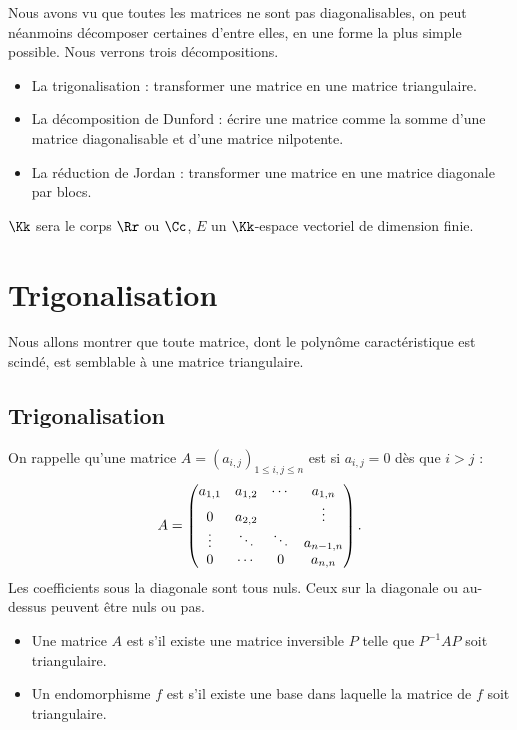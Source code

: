 \documentclass[12pt, class=report,crop=false]{standalone}
\begin{document}


Nous avons vu que toutes les matrices ne sont pas diagonalisables, 
on peut néanmoins décomposer certaines d'entre elles, en une forme la plus simple possible.
Nous verrons trois décompositions. 
\begin{itemize}
  \item La trigonalisation : transformer une matrice en une matrice triangulaire.
  \item La décomposition de Dunford : écrire une matrice comme la somme d'une matrice diagonalisable et d'une matrice nilpotente.
  \item La réduction de Jordan : transformer une matrice en une matrice diagonale par blocs.
\end{itemize}

$\Kk$ sera le corps $\Rr$ ou $\Cc$, $E$ un $\Kk$-espace vectoriel de dimension finie.


\section{Trigonalisation}

Nous allons montrer que toute matrice, dont le polynôme caractéristique est scindé, est semblable à une matrice triangulaire.

\subsection{Trigonalisation}


On rappelle qu'une matrice $A=(a_{i,j})_{1\leq i,j\leq n}$ est  
si $a_{i,j}=0$ dès que $i> j$ :
$$A=\begin{pmatrix}
a_{1,1}&a_{1,2}&\cdots &a_{1,n} \cr 
0&a_{2,2} & &\vdots \cr
\vdots &\ddots &\ddots& a_{n-1,n}\cr
0&\cdots&0&a_{n,n}
\end{pmatrix}.$$
Les coefficients sous la diagonale sont tous nuls. Ceux sur la diagonale ou au-dessus peuvent être nuls ou pas.

\begin{definition}
\sauteligne
\begin{itemize}
  \item Une matrice $A$ est 
  s'il existe une matrice inversible $P$ telle que $P^{-1}AP$ soit triangulaire.
  
  \item Un endomorphisme $f$ est  s'il existe une
base dans laquelle la matrice de $f$ soit triangulaire.
\end{itemize}
\end{definition} 
\end{document}
